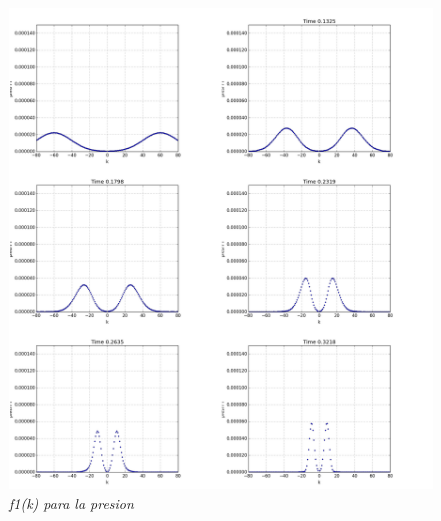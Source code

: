 \documentclass{article}
\begin{document}
\begin{description}
 
\item \begin{figure}[!ht]
 \centering
 \includegraphics[scale=0.2]{pfourinhom1.png}
 \caption{\emph{f1(k) para la presion}}
\end{figure}



\end{description}
\end{document}

